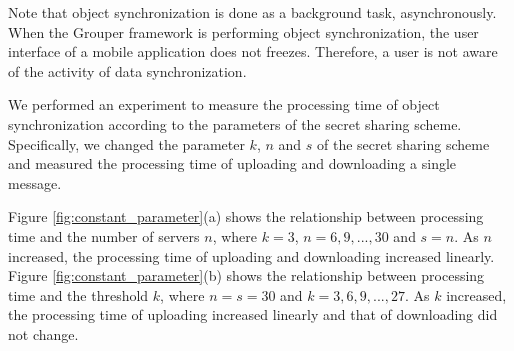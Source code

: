 \documentclass[a4paper,11pt]{report}
\begin{document}
Note that object synchronization is done as a background task, asynchronously.
When the Grouper framework is performing object synchronization, the user interface of a mobile application does not freezes.
Therefore, a user is not aware of the activity of data synchronization.

We performed an experiment to measure the processing time of object synchronization according to the parameters of the secret sharing scheme.
Specifically, we changed the parameter $k$, $n$ and $s$ of the secret sharing scheme and measured the processing time of uploading and downloading a single message.

Figure \ref{fig:constant_parameter}(a) shows the relationship between processing time and the number of servers $n$, where ${k=3}$,  ${n = 6, 9, ... , 30}$ and $s = n$.
As $n$ increased, the processing time of uploading and downloading increased linearly. 
Figure \ref{fig:constant_parameter}(b) shows the relationship between processing time and the threshold $k$, where ${n = s =30}$ and ${k = 3, 6, 9, ... , 27}$.
As $k$ increased, the processing time of uploading increased linearly and that of downloading did not change.
\end{document}
